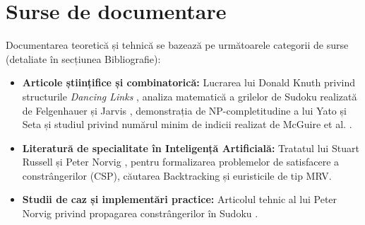 \section{Surse de documentare}
Documentarea teoretică și tehnică se bazează pe următoarele categorii de surse (detaliate în secțiunea Bibliografie):
\begin{itemize}
    \item \textbf{Articole științifice și combinatorică:} Lucrarea lui Donald Knuth privind structurile \textit{Dancing Links} \cite{knuth2000}, analiza matematică a grilelor de Sudoku realizată de Felgenhauer și Jarvis \cite{felgenhauer2006}, demonstrația de NP-completitudine a lui Yato și Seta \cite{yato2003} și studiul privind numărul minim de indicii realizat de McGuire et al. \cite{mcguire2014}.
    \item \textbf{Literatură de specialitate în Inteligență Artificială:} Tratatul lui Stuart Russell și Peter Norvig \cite{russell2020}, pentru formalizarea problemelor de satisfacere a constrângerilor (CSP), căutarea Backtracking și euristicile de tip MRV.
    \item \textbf{Studii de caz și implementări practice:} Articolul tehnic al lui Peter Norvig privind propagarea constrângerilor în Sudoku \cite{norvig2006}.
\end{itemize}

